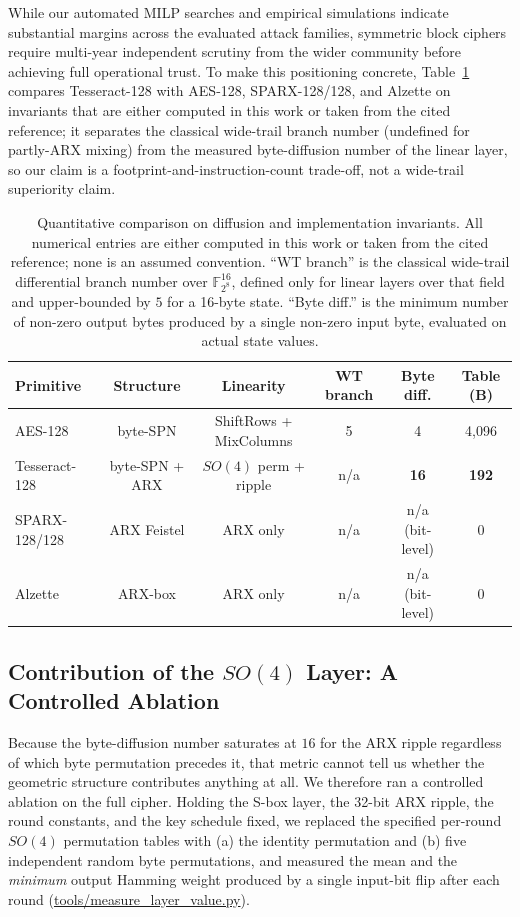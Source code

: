 \documentclass[review,12pt]{elsarticle}
\begin{document}
While our automated MILP searches and empirical simulations indicate substantial margins across the evaluated attack families, symmetric block ciphers require multi-year independent scrutiny from the wider community before achieving full operational trust. To make this positioning concrete, Table~\ref{tab:branch_number} compares Tesseract-128 with AES-128, SPARX-128/128, and Alzette on invariants that are either computed in this work or taken from the cited reference; it separates the classical wide-trail branch number (undefined for partly-ARX mixing) from the measured byte-diffusion number of the linear layer, so our claim is a footprint-and-instruction-count trade-off, not a wide-trail superiority claim.

\begin{table}[htbp]
\caption{Quantitative comparison on diffusion and implementation invariants. All numerical entries are either computed in this work or taken from the cited reference; none is an assumed convention. ``WT branch'' is the classical wide-trail differential branch number over $\mathbb{F}_{2^8}^{16}$, defined only for linear layers over that field and upper-bounded by $5$ for a 16-byte state. ``Byte diff.'' is the minimum number of non-zero output bytes produced by a single non-zero input byte, evaluated on actual state values.}
\label{tab:branch_number}
\centering
\small
\begin{tabular}{@{}lccccc@{}}
\toprule
\textbf{Primitive} & \textbf{Structure} & \textbf{Linearity} & \textbf{WT branch} & \textbf{Byte diff.} & \textbf{Table (B)} \\
\midrule
AES-128          & byte-SPN       & ShiftRows + MixColumns & 5 & 4 & 4{,}096 \\
Tesseract-128    & byte-SPN + ARX & $SO(4)$ perm + ripple  & n/a & \textbf{16} & \textbf{192} \\
SPARX-128/128    & ARX Feistel    & ARX only               & n/a & n/a (bit-level) & 0 \\
Alzette          & ARX-box        & ARX only               & n/a & n/a (bit-level) & 0 \\
\bottomrule
\end{tabular}
\end{table}

\subsection{Contribution of the $SO(4)$ Layer: A Controlled Ablation}
\label{sec:layer_value}
Because the byte-diffusion number saturates at $16$ for the ARX ripple regardless of which byte permutation precedes it, that metric cannot tell us whether the geometric structure contributes anything at all. We therefore ran a controlled ablation on the full cipher. Holding the S-box layer, the 32-bit ARX ripple, the round constants, and the key schedule fixed, we replaced the specified per-round $SO(4)$ permutation tables with (a) the identity permutation and (b) five independent random byte permutations, and measured the mean and the \emph{minimum} output Hamming weight produced by a single input-bit flip after each round (\url{tools/measure_layer_value.py}).
\end{document}
